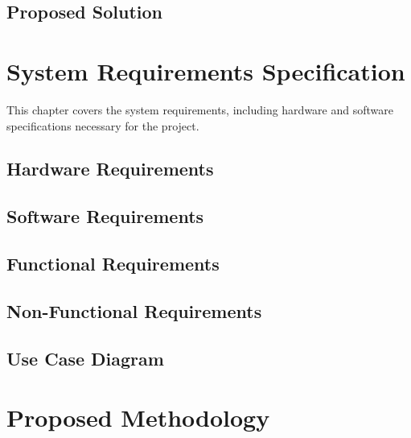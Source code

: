 \documentclass[12pt]{report}
\begin{document}
\section{Proposed Solution}

\newpage

\chapter{System Requirements Specification}

This chapter covers the system requirements, including hardware and software specifications necessary for the project.

\section{Hardware Requirements}

\section{Software Requirements}

\section{Functional Requirements}

\section{Non-Functional Requirements}

\section{Use Case Diagram}

\newpage

\chapter{Proposed Methodology}

\end{document}
